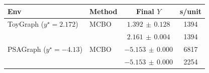 \begin{tabular}{@{}llcc@{}}
\toprule
\textbf{Env} & \textbf{Method} & \textbf{Final $Y$} & \textbf{s/unit} \\
\midrule
ToyGraph {\footnotesize($y^\star{=}2.172$)} & MCBO & $1.392{\scriptstyle\,\pm\,}0.128$ & 1394 \\
 & \QMCBO{} & $2.161{\scriptstyle\,\pm\,}0.004$ & 1394 \\
\addlinespace[2pt]
PSAGraph {\footnotesize($y^\star{=}-4.13$)} & MCBO & $-5.153{\scriptstyle\,\pm\,}0.000$ & 6817 \\
 & \QMCBO{} & $-5.153{\scriptstyle\,\pm\,}0.000$ & 2254 \\
\bottomrule
\end{tabular}
